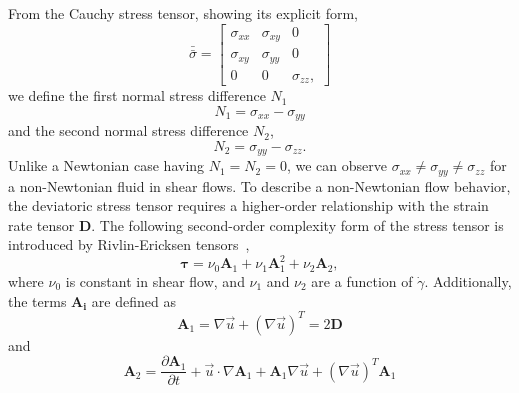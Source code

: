 \par
From the Cauchy stress tensor, showing its explicit form, 
\begin{equation}
  \bar{\bar{\sigma}} = 
  \begin{bmatrix}
    \sigma_{xx} & \sigma_{xy} & 0 
    \\
    \sigma_{xy} & \sigma_{yy} & 0 
    \\
    0 & 0 & \sigma_{zz},
  \end{bmatrix}
  \label{eq_cauchy_mx}
\end{equation} 
we define the first normal stress difference $N_1$
\begin{equation}
  N_1 = \sigma_{xx} - \sigma_{yy}
\end{equation}
and the second normal stress difference $N_2$,
\begin{equation}
  N_2 = \sigma_{yy} - \sigma_{zz}.
\end{equation}
Unlike a Newtonian case having $N_1 = N_2 = 0$, we can observe $\sigma_{xx} \neq \sigma_{yy} \neq \sigma_{zz}$ for a non-Newtonian fluid in shear flows.
To describe a non-Newtonian flow behavior, the deviatoric stress tensor requires a higher-order relationship with the strain rate tensor $\bm{D}$. The following second-order complexity form of the stress tensor is introduced by Rivlin-Ericksen tensors~\cite{rivlin_stress-deformation_1955},
\begin{equation}
   \boldsymbol{\tau} = 
    \nu_0  \bm{A}_1 +  \nu_1  \bm{A}_1^2 + \nu_2 \bm{A}_2,
   \label{eq_CN_tau}
\end{equation}
where $\nu_0$ is constant in shear flow, and $\nu_1$ and $\nu_2$ are a function of $\dot{\gamma}$.
Additionally, the terms $\bm{A_i}$ are defined as
\begin{equation}
   {\bm A_1}  = \nabla \vec{u} +  \left( \nabla \vec{u} \right)^T = 2 \bm{D}
\end{equation}
and 
\begin{equation}
   \boldsymbol{A}_2
   =\frac{\partial \boldsymbol{A}_1}{\partial t} + \vec{u} \cdot \nabla \boldsymbol{A}_1+\boldsymbol{A}_1 \nabla \vec{u}+ \left(\nabla \vec{u} \right)^T \boldsymbol{A}_1
\end{equation}
